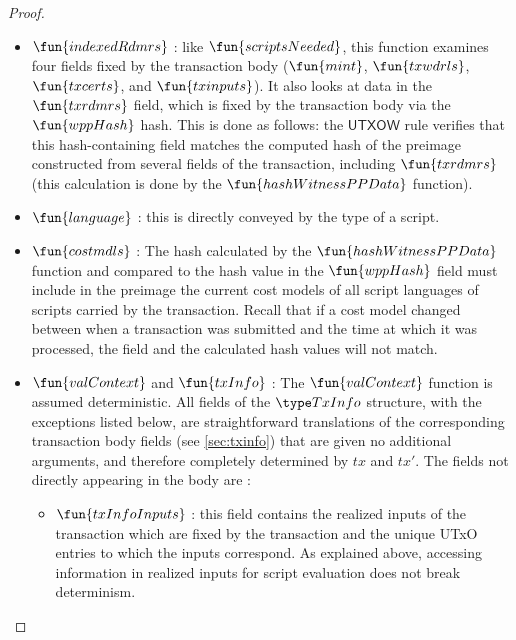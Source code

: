 \begin{property}
\begin{proof}
\begin{itemize}
      \item $\fun{indexedRdmrs}$ : like $\fun{scriptsNeeded}$, this function
      examines four fields fixed by the transaction body ($\fun{mint}$, $\fun{txwdrls}$,
      $\fun{txcerts}$, and $\fun{txinputs}$).
      It also looks at data in the $\fun{txrdmrs}$ field, which is fixed
      by the transaction body via the $\fun{wppHash}$
      hash. This is done as follows: the $\mathsf{UTXOW}$ rule verifies that this
      hash-containing field matches the computed hash
      of the preimage constructed from several fields of the transaction,
      including $\fun{txrdmrs}$ (this calculation
      is done by the $\fun{hashWitnessPPData}$ function).

      \item $\fun{language}$ : this is directly conveyed by the type of a script.

      \item $\fun{costmdls}$ : The hash calculated by the $\fun{hashWitnessPPData}$
      function and compared to the hash value in the $\fun{wppHash}$ field
      must include in the preimage the current cost models of
      all script languages of scripts carried by the transaction. Recall that
      if a cost model changed between when a transaction was submitted and the
      time at which it was processed, the field and the calculated hash values
      will not match.

      \item $\fun{valContext}$ and $\fun{txInfo}$ :
      The $\fun{valContext}$ function is assumed deterministic.
      All fields of the $\TxInfo$
      structure, with the exceptions listed below,
      are straightforward translations of the corresponding transaction body fields (see \ref{sec:txinfo}) that
      are given no additional arguments,
      and therefore completely determined by $tx$ and $tx'$. The fields not directly
      appearing in the body are :

      \begin{itemize}
        \item $\fun{txInfoInputs}$ : this field contains the realized inputs of
        the transaction which are fixed by the transaction and the unique
        UTxO entries to which the inputs correspond. As explained above,
        accessing information in realized inputs for script evaluation
        does not break determinism.


\end{itemize}
\end{itemize}
\end{proof}
\end{property}
